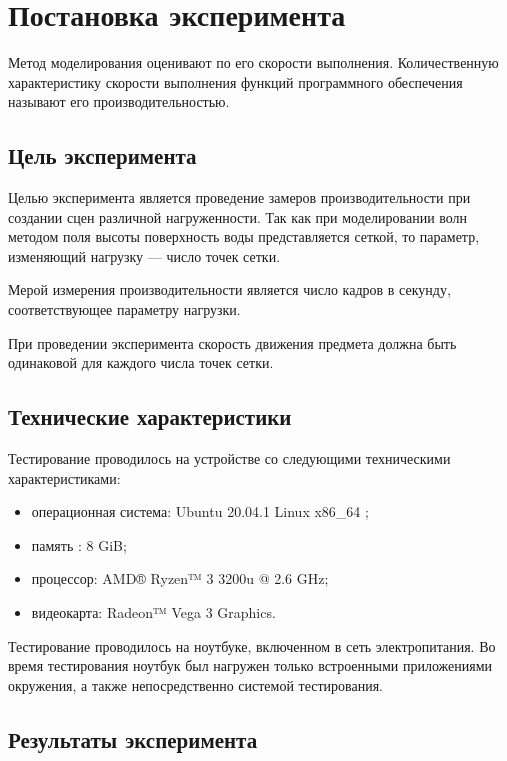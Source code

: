 \section{Постановка эксперимента}

Метод моделирования оценивают по его скорости выполнения. Количественную характеристику скорости выполнения функций программного обеспечения называют его производительностью.

\subsection{Цель эксперимента}

Целью эксперимента является проведение замеров производительности при создании сцен различной нагруженности. Так как при моделировании волн методом поля высоты поверхность воды представляется сеткой, то параметр, изменяющий нагрузку --- число точек сетки.

Мерой измерения производительности является число кадров в секунду, соответствующее параметру нагрузки. 

При проведении эксперимента скорость движения предмета должна быть одинаковой для каждого числа точек сетки.

\subsection{Технические характеристики}

Тестирование проводилось на устройстве со следующими техническими характеристиками:

\begin{itemize}
	\item операционная система: Ubuntu 20.04.1 Linux x86\_64 \cite{linux};
	\item память : 8 GiB;
	\item процессор: AMD® Ryzen™ 3 3200u @ 2.6 GHz;
	\item видеокарта: Radeon™ Vega 3 Graphics.
\end{itemize}

Тестирование проводилось на ноутбуке, включенном в сеть электропитания. Во время тестирования ноутбук был нагружен только встроенными приложениями окружения, а также непосредственно системой тестирования.

\subsection{Результаты эксперимента}

